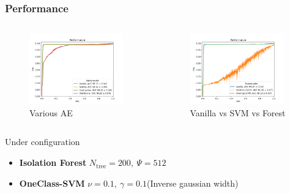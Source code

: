 \documentclass{beamer}
\begin{document}
\begin{frame}
\frametitle{Performance}
\begin{columns}
    \begin{figure}
        \includegraphics[height=0.55\textheight, width=0.95\textwidth]{images/performance_ae}
        \caption{Various AE}
    \end{figure}
    \begin{figure}
        \includegraphics[height=0.55\textheight, width=0.95\textwidth]{images/performance_ml}
        \caption{Vanilla vs SVM vs Forest}
    \end{figure}
\end{columns}
\tiny
Under configuration
\begin{itemize}
    \item \textbf{Isolation Forest}  $N_{\text{tree}} = 200,\ \Psi = 512$
    \item \textbf{OneClass-SVM} $\nu = 0.1,\ \gamma = 0.1$(Inverse gaussian width)
\end{itemize}
\end{frame}
\end{document}
